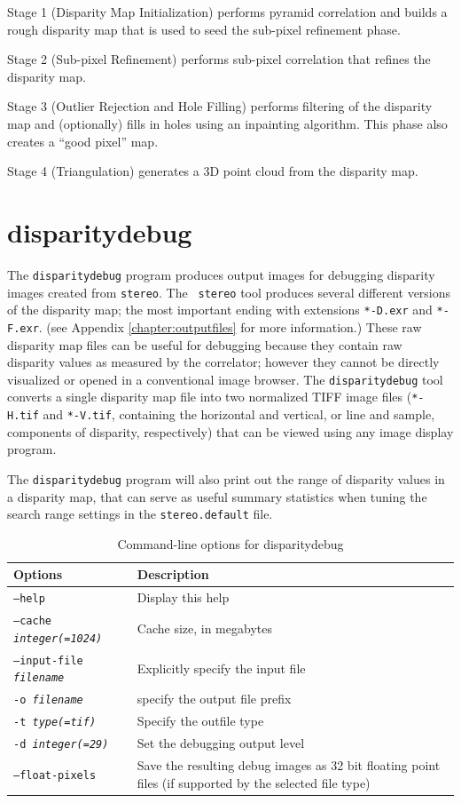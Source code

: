 Stage 1 (Disparity Map Initialization) performs pyramid correlation and builds a rough disparity map that is used to seed the sub-pixel refinement phase.

Stage 2 (Sub-pixel Refinement) performs sub-pixel correlation that
refines the disparity map.

Stage 3 (Outlier Rejection and Hole Filling) performs filtering of the
disparity map and (optionally) fills in holes using an inpainting
algorithm.  This phase also creates a ``good pixel'' map.

Stage 4 (Triangulation) generates a 3D point cloud from the disparity
map.

\section{disparitydebug}
\label{disparitydebug}

The \texttt{disparitydebug} program produces output images for
debugging disparity images created from \verb#stereo#. The {\tt
stereo} tool produces several different versions of the disparity
map; the most important ending with extensions \verb#*-D.exr# and
\verb#*-F.exr#. (see Appendix \ref{chapter:outputfiles} for more
information.)  These raw disparity map files can be useful for
debugging because they contain raw disparity values as measured by
the correlator; however they cannot be directly visualized or opened
in a conventional image browser.  The \verb#disparitydebug# tool
converts a single disparity map file into two normalized TIFF image
files (\verb#*-H.tif# and \verb#*-V.tif#, containing the horizontal
and vertical, or line and sample, components of disparity, respectively)
that can be viewed using any image display program.

The {\tt disparitydebug} program will also print out the range of
disparity values in a disparity map, that can serve as useful summary
statistics when tuning the search range settings in the
{\tt stereo.default} file.

\begin{longtable}{|l|p{10cm}|}
\caption{Command-line options for disparitydebug}
\label{tbl:disparitydebug}
\endfirsthead
\endhead
\endfoot
\endlastfoot
\hline
Options & Description \\ \hline \hline
\texttt{--help} & Display this help\\ \hline
\texttt{--cache \textit{integer(=1024)}} & Cache size, in megabytes \\ \hline
\texttt{--input-file \textit{filename}} & Explicitly specify the input file \\ \hline
\texttt{-o \textit{filename}} & specify the output file prefix \\ \hline
\texttt{-t \textit{type(=tif)}} & Specify the outfile type \\ \hline
\texttt{-d \textit{integer(=29)}} & Set the debugging output level \\ \hline
\texttt{--float-pixels} & Save the resulting debug images as 32 bit floating point files (if supported by the selected file type) \\ \hline
\end{longtable}

